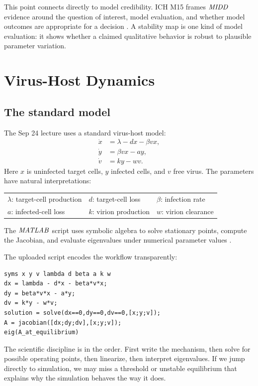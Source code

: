 \documentclass[a4paper]{article}
\newcommand{\MIDD}{\ensuremath{\pksym{MIDD}}}
\newcommand{\MATLAB}{\ensuremath{\pksym{MATLAB}}}
\begin{document}
This point connects directly to model credibility. ICH M15 frames \MIDD{} evidence around the question of interest, model evaluation, and whether model outcomes are appropriate for a decision \cite{ichM15Midd2026}. A stability map is one kind of model evaluation: it shows whether a claimed qualitative behavior is robust to plausible parameter variation.

\section{Virus-Host Dynamics}

\subsection{The standard model}

The Sep 24 lecture uses a standard virus-host model:
\[
  \begin{aligned}
  \dot x &= \lambda-dx-\beta vx,\\
  \dot y &= \beta vx-ay,\\
  \dot v &= ky-wv.
  \end{aligned}
\]
Here \(x\) is uninfected target cells, \(y\) infected cells, and \(v\) free virus. The parameters have natural interpretations:
\begin{center}
\begin{tabularx}{0.9\textwidth}{@{}lll@{}}
\(\lambda\): target-cell production & \(d\): target-cell loss & \(\beta\): infection rate\\
\(a\): infected-cell loss & \(k\): virion production & \(w\): virion clearance
\end{tabularx}
\end{center}
The \MATLAB{} script uses symbolic algebra to solve stationary points, compute the Jacobian, and evaluate eigenvalues under numerical parameter values \cite{bmeg671MatlabNonlinearStability2025}.

The uploaded script encodes the workflow transparently:
\begin{verbatim}
syms x y v lambda d beta a k w
dx = lambda - d*x - beta*v*x;
dy = beta*v*x - a*y;
dv = k*y - w*v;
solution = solve(dx==0,dy==0,dv==0,[x;y;v]);
A = jacobian([dx;dy;dv],[x;y;v]);
eig(A_at_equilibrium)
\end{verbatim}
The scientific discipline is in the order. First write the mechanism, then solve for possible operating points, then linearize, then interpret eigenvalues. If we jump directly to simulation, we may miss a threshold or unstable equilibrium that explains why the simulation behaves the way it does.
\end{document}
